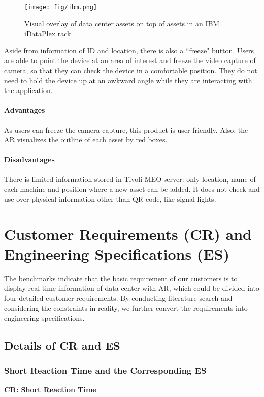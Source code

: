 \documentclass[11pt,a4paper]{article}
\begin{document}
\begin{onehalfspace}
\begin{figure}[H]
    \centering
    \texttt{[image: fig/ibm.png]}
    \caption{Visual overlay of data center assets on top of assets in an IBM iDataPlex rack.}
    \label{fig:ibm}
\end{figure}

Aside from information of ID and location, there is also a ``freeze" button. Users are able to point the device at an area of interest and freeze the video capture of camera, so that they can check the device in a comfortable position. They do not need to hold the device up at an awkward angle while they are interacting with the application.

\paragraph{Advantages} As users can freeze the camera capture, this product is user-friendly. Also, the AR visualizes the outline of each asset by red boxes.


\paragraph{Disadvantages} There is limited information stored in Tivoli MEO server: only location, name of each machine and position where a new asset can be added. It does not check and use over physical information other than QR code, like signal lights.


\section{Customer Requirements (CR) and Engineering Specifications (ES)}\label{sec_es}
The benchmarks indicate that the basic requirement of our customers is to display real-time information of data center with AR, which could be divided into four detailed customer requirements. By conducting literature search and considering the constraints in reality, we further convert the requirements into engineering specifications.

\subsection{Details of CR and ES}

\subsubsection{Short Reaction Time and the Corresponding ES}
\textbf{CR: Short Reaction Time}


\end{onehalfspace}
\end{document}
